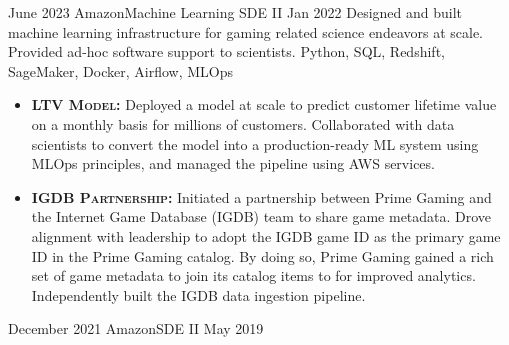 \documentclass{cv}
\begin{document}
	\begin{experiences_env}
		\experienceWithProjects
			{June 2023}     {Amazon}{Machine Learning SDE II}
			{Jan 2022}      {
								Designed and built machine learning infrastructure for gaming related science endeavors at scale. Provided ad-hoc software support to scientists.
							}
							{Python, SQL, Redshift, SageMaker, Docker, Airflow, MLOps}
							{
								\begin{itemize}
									\item \textbf{\textsc{LTV Model:}} Deployed a model at scale to predict customer lifetime value on a monthly basis for millions of customers. Collaborated with data scientists to convert the model into a production-ready ML system using MLOps principles, and managed the pipeline using AWS services.
									\item \textbf{\textsc{IGDB Partnership:}} Initiated a partnership between Prime Gaming and the Internet Game Database (IGDB) team to share game metadata. Drove alignment with leadership to adopt the IGDB game ID as the primary game ID in the Prime Gaming catalog. By doing so, Prime Gaming gained a rich set of game metadata to join its catalog items to for improved analytics. Independently built the IGDB data ingestion pipeline.
								\end{itemize}
							}
		\emptySeparator
		\experienceWithProjects
	   {December 2021}      {Amazon}{SDE II}
			{May 2019}      {

}
\end{experiences_env}
\end{document}
